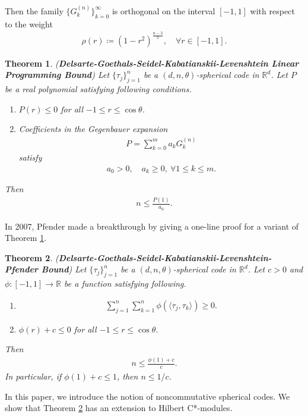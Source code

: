\documentclass{amsart}
\newtheorem{theorem}{Theorem}[section]
\begin{document}
Then the family $\{G_k^{(n)}\}_{k=0}^\infty$ is orthogonal on the interval $[-1,1] $ with respect to the weight 
\begin{align*}
	\rho(r)\coloneqq (1-r^2)^\frac{n-3}{2}, \quad \forall r \in [-1,1].
\end{align*}
\begin{theorem} \cite{DELSARTEGOETHALSSEIDEL, ERICSONZINOVIEV} (\textbf{Delsarte-Goethals-Seidel-Kabatianskii-Levenshtein Linear Programming Bound}) \label{DGS}
	Let $\{\tau_j\}_{j=1}^n$  be a  $(d,n,\theta )$-spherical code in $\mathbb{R}^d$. 
	Let $P$ be a real polynomial satisfying following conditions.
	\begin{enumerate}[\upshape(i)]
		\item $P(r)\leq 0$ for all $-1\leq r\leq \cos \theta$.
		\item Coefficients in the  Gegenbauer expansion 
		\begin{align*}
			P=\sum_{k=0}^{m}a_kG_k^{(n)}
		\end{align*}
	satisfy 
	\begin{align*}
a_0>0, \quad a_k\geq 0, ~\forall 1\leq k \leq m.
	\end{align*}
	\end{enumerate}
Then
\begin{align*}
	n \leq \frac{P(1)}{a_0}.
\end{align*}
\end{theorem}
 In 2007, Pfender made a breakthrough by giving a  one-line proof for a variant of Theorem  \ref{DGS}.
 \begin{theorem}  \cite{PFENDER} (\textbf{Delsarte-Goethals-Seidel-Kabatianskii-Levenshtein-Pfender Bound}) \label{PFENDERT}
 	Let $\{\tau_j\}_{j=1}^n$  be a  $(d,n,\theta )$-spherical code in $\mathbb{R}^d$. Let $c>0$ and $\phi:[-1,1]\to \mathbb{R}$ be a function satisfying following.
 	\begin{enumerate}[\upshape(i)]
 		\item 
 		\begin{align*}
 			\sum_{j=1}^n\sum_{k =1}^n\phi(\langle \tau_j, \tau_k\rangle)\geq 0.	
 		\end{align*}
 		\item $\phi(r)+c\leq 0$ for all $-1\leq r \leq \cos \theta$.
 	\end{enumerate}
 Then 
 \begin{align*}
 	n\leq \frac{\phi(1)+c}{c}.
 \end{align*}
In particular, if $\phi(1)+c\leq 1$, then $n\leq 1/c$.
 \end{theorem}
In this paper, we introduce the notion of noncommutative spherical codes. We show that Theorem  \ref{PFENDERT} has an extension to Hilbert C*-modules.
\end{document}
